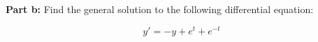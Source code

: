 \documentclass{article}
\begin{document}






\noindent\textbf{Part b:} Find the general solution to the following differential equation:

\begin{equation*}
    y'=-y+e^t+e^{-t}
\end{equation*}
\end{document}
